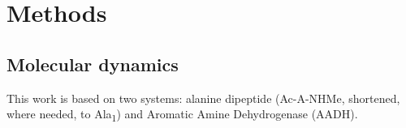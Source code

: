 




\section{Methods}\label{sec:methods}
\subsection{Molecular dynamics}
This work is based on two systems: alanine dipeptide (Ac-A-NHMe, shortened, where needed, to Ala\textsubscript{1}) and Aromatic Amine Dehydrogenase (AADH). 

